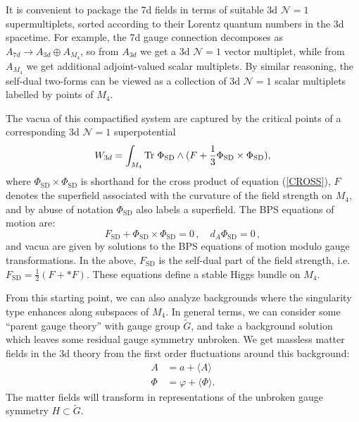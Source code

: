 \documentclass[12pt]{article}%
\numberwithin{equation}{section}
\renewcommand{\(}{\left(}
\renewcommand{\)}{\right)}
\renewcommand{\[}{\left[}
\renewcommand{\]}{\right]}
\begin{document}
It is convenient to package the 7d fields in terms of suitable 3d $\mathcal{N} = 1$ supermultiplets, sorted according to their Lorentz quantum numbers in the 3d spacetime. For example, the 7d gauge connection decomposes as $A_{7d} \rightarrow A_{3d} \oplus A_{M_4}$, so from $A_{3d}$ we get a 3d $\mathcal{N} = 1$ vector multiplet, while from $A_{M_4}$ we get additional adjoint-valued scalar multiplets. By similar reasoning, the self-dual two-forms can be viewed as a collection of 3d $\mathcal{N} = 1$ scalar multiplets labelled by points of $M_4$.

The vacua of this compactified system are captured by the critical points of a corresponding 3d $\mathcal{N} = 1$ superpotential
\begin{equation}\label{W}
W_{3d}=\int_{M_4} \textnormal{Tr}\; \Phi_{\mathrm{SD}}\wedge (F + \frac{1}{3}\Phi_{\mathrm{SD}}\times \Phi_{\mathrm{SD}}),
\end{equation}
where $\Phi_{\mathrm{SD}} \times \Phi_{\mathrm{SD}}$ is shorthand for the cross product of equation (\ref{CROSS}),
$F$ denotes the superfield associated with the curvature of the field strength on $M_4$, and by abuse
of notation $\Phi_{\mathrm{SD}}$ also labels a superfield. The BPS equations of motion are:
\begin{equation}
F_{\mathrm{SD}} + \Phi_{\mathrm{SD}} \times \Phi_{\mathrm{SD}} = 0\,, \quad d_{A} \Phi_{\mathrm{SD}} = 0\,,
\end{equation}
and vacua are given by solutions to the BPS equations of motion modulo gauge transformations. In the above, $F_{\mathrm{SD}}$
is the self-dual part of the field strength, i.e. $F_{\mathrm{SD}} = \frac{1}{2} (F + \ast F)$. These equations define a stable
Higgs bundle on $M_4$.

From this starting point, we can also analyze backgrounds where the singularity type enhances along subspaces of $M_4$. In general terms, we can consider some ``parent gauge theory'' with gauge group $\widetilde{G}$, and take
a background solution which leaves some residual gauge symmetry unbroken.
We get massless matter fields in the 3d theory from the first order
fluctuations around this background:
\begin{align}
A & = a + \langle A \rangle \\
\Phi & = \varphi + \langle \Phi \rangle .
\end{align}
The matter fields will transform in representations of the unbroken gauge symmetry $H \subset \widetilde{G}$.
\end{document}
